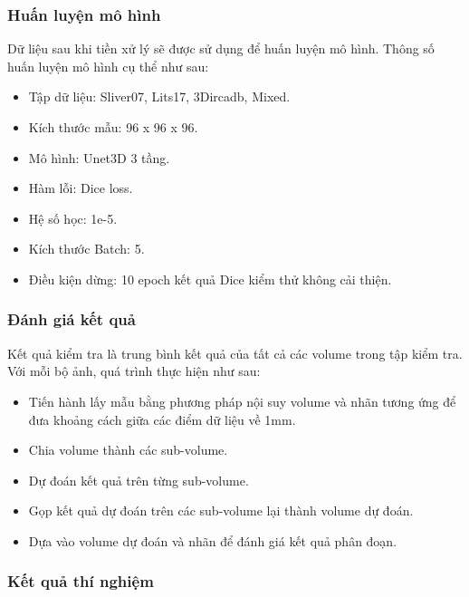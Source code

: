 \subsubsection{Huấn luyện mô hình}
Dữ liệu sau khi tiền xử lý sẽ được sử dụng để huấn luyện mô hình. Thông số huấn luyện mô hình cụ thể như sau:
\begin{itemize}
    \item Tập dữ liệu: Sliver07, Lits17, 3Dircadb, Mixed.
    \item Kích thước mẫu: 96 x 96 x 96.
    \item Mô hình: Unet3D 3 tầng.
    \item Hàm lỗi: Dice loss.
    \item Hệ số học: 1e-5.
    \item Kích thước Batch: 5.
    \item Điều kiện dừng: 10 epoch kết quả Dice kiểm thử không cải thiện.
\end{itemize}

\subsubsection{Đánh giá kết quả}
Kết quả kiểm tra là trung bình kết quả của tất cả các volume trong tập kiểm tra. Với mỗi bộ ảnh, quá trình thực hiện như sau:
\begin{itemize}[noitemsep, topsep=0pt]
    \item Tiến hành lấy mẫu bằng phương pháp nội suy volume và nhãn tương ứng để đưa khoảng cách giữa các điểm dữ liệu về 1mm.
    \item Chia volume thành các sub-volume.
    \item Dự đoán kết quả trên từng sub-volume.
    \item Gọp kết quả dự đoán trên các sub-volume lại thành volume dự đoán.
    \item Dựa vào volume dự đoán và nhãn để đánh giá kết quả phân đoạn.
\end{itemize}
\subsubsection{Kết quả thí nghiệm}

